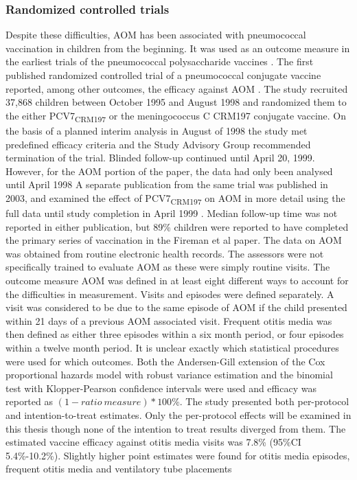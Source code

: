 \documentclass[]{book}
\theoremstyle{definition}
\theoremstyle{definition}
\theoremstyle{definition}
\theoremstyle{remark}
\begin{document}
\subsubsection{Randomized controlled
trials}\label{randomized-controlled-trials}

Despite these difficulties, AOM has been associated with pneumococcal
vaccination in children from the beginning. It was used as an outcome
measure in the earliest trials of the pneumococcal polysaccharide
vaccines \citep{Makela1981, Sloyer1981}. The first published randomized
controlled trial of a pneumococcal conjugate vaccine reported, among
other outcomes, the efficacy against AOM \citep{Black2000}. The study
recruited 37,868 children between October 1995 and August 1998 and
randomized them to the either PCV7\textsubscript{CRM197} or the
meningococcus C CRM197 conjugate vaccine. On the basis of a planned
interim analysis in August of 1998 the study met predefined efficacy
criteria and the Study Advisory Group recommended termination of the
trial. Blinded follow-up continued until April 20, 1999. However, for
the AOM portion of the paper, the data had only been analysed until
April 1998 A separate publication from the same trial was published in
2003, and examined the effect of PCV7\textsubscript{CRM197} on AOM in
more detail using the full data until study completion in April 1999
\citep{Fireman2003}. Median follow-up time was not reported in either
publication, but 89\% children were reported to have completed the
primary series of vaccination in the Fireman et al paper. The data on
AOM was obtained from routine electronic health records. The assessors
were not specifically trained to evaluate AOM as these were simply
routine visits. The outcome measure AOM was defined in at least eight
different ways to account for the difficulties in measurement. Visits
and episodes were defined separately. A visit was considered to be due
to the same episode of AOM if the child presented within 21 days of a
previous AOM associated visit. Frequent otitis media was then defined as
either three episodes within a six month period, or four episodes within
a twelve month period. It is unclear exactly which statistical
procedures were used for which outcomes. Both the Andersen-Gill
extension of the Cox proportional hazards model with robust variance
estimation and the binomial test with Klopper-Pearson confidence
intervals were used and efficacy was reported as
\((1 - ratio\ measure) *100\%\). The study presented both per-protocol
and intention-to-treat estimates. Only the per-protocol effects will be
examined in this thesis though none of the intention to treat results
diverged from them. The estimated vaccine efficacy against otitis media
visits was 7.8\% (95\%CI 5.4\%-10.2\%). Slightly higher point estimates
were found for otitis media episodes, frequent otitis media and
ventilatory tube placements \citep{Black2000, Fireman2003}
\end{document}
